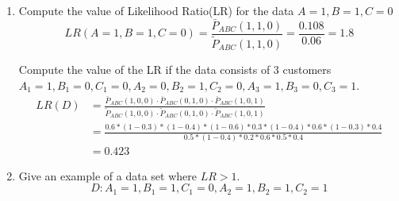 \documentclass[preprint,12pt]{elsarticle}
\begin{document}
\begin{enumerate}[label=\alph*]
		\item Compute the value of Likelihood Ratio(LR) for the data $A=1,B=1,C=0$
		\begin{equation*}
			LR(A=1,B=1,C=0) = \frac{\bar{P}_{ABC}(1,1,0)}{\tilde{P}_{ABC}(1,1,0)} = \frac{0.108}{0.06} = 1.8
		\end{equation*}

		Compute the value of the LR if the data consists of 3 customers 
		$A_1=1,B_1=0,C_1=0,A_2=0,B_2=1,C_2=0,A_3=1,B_3=0,C_3=1$.
		\begin{align*}
			LR(D) &= \frac{\bar{P}_{ABC}(1,0,0)\cdot \bar{P}_{ABC}(0,1,0)\cdot \bar{P}_{ABC}(1,0,1)}{\tilde{P}_{ABC}(1,0,0)\cdot \tilde{P}_{ABC}(0,1,0)\cdot \tilde{P}_{ABC}(1,0,1)}\\
			&= \frac{0.6*(1-0.3)*(1-0.4)*(1-0.6)*0.3*(1-0.4)*0.6*(1-0.3)*0.4}{0.5*(1-0.4)*0.2*0.6*0.5*0.4}\\
			&= 0.423
		\end{align*}

		\item Give an example of a data set where $LR>1$.
		\begin{equation*}
			D:A_1=1,B_1=1,C_1=0,A_2=1,B_2=1,C_2=1
		\end{equation*}
		
	\end{enumerate}
\end{document}
